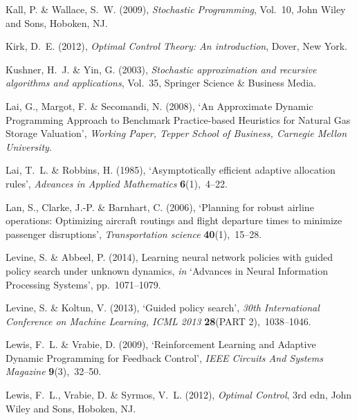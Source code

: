 \documentclass[11pt,oneside,fleqn,reqno,titlepage]{article}
\begin{document}
\begin{thebibliography}{xx}
Kall, P. \& Wallace, S.~W.  (2009), {\em {Stochastic Programming}}, Vol.~10,
  John Wiley and Sons, Hoboken, NJ.

Kirk, D.~E.  (2012), {\em {Optimal Control Theory: An introduction}}, Dover,
  New York.

Kushner, H.~J. \& Yin, G.  (2003), {\em Stochastic approximation and recursive
  algorithms and applications}, Vol.~35, Springer Science \& Business Media.

Lai, G., Margot, F. \& Secomandi, N.  (2008), `{An Approximate Dynamic
  Programming Approach to Benchmark Practice-based Heuristics for Natural Gas
  Storage Valuation}', {\em Working Paper, Tepper School of Business, Carnegie
  Mellon University.}

Lai, T.~L. \& Robbins, H.  (1985), `{Asymptotically efficient adaptive
  allocation rules}', {\em Advances in Applied Mathematics} {\bf 6}(1),~4--22.

Lan, S., Clarke, J.-P. \& Barnhart, C.  (2006), `Planning for robust airline
  operations: Optimizing aircraft routings and flight departure times to
  minimize passenger disruptions', {\em Transportation science} {\bf
  40}(1),~15--28.

Levine, S. \& Abbeel, P.  (2014), Learning neural network policies with guided
  policy search under unknown dynamics, {\em in} `Advances in Neural
  Information Processing Systems', pp.~1071--1079.

Levine, S. \& Koltun, V.  (2013), `{Guided policy search}', {\em 30th
  International Conference on Machine Learning, ICML 2013} {\bf 28}(PART
  2),~1038--1046.

Lewis, F.~L. \& Vrabie, D.  (2009), `{Reinforcement Learning and Adaptive
  Dynamic Programming for Feedback Control}', {\em IEEE Circuits And Systems
  Magazine} {\bf 9}(3),~32--50.

Lewis, F.~L., Vrabie, D. \& Syrmos, V.~L.  (2012), {\em {Optimal Control}}, 3rd
  edn, John Wiley and Sons, Hoboken, NJ.


\end{thebibliography}
\end{document}
